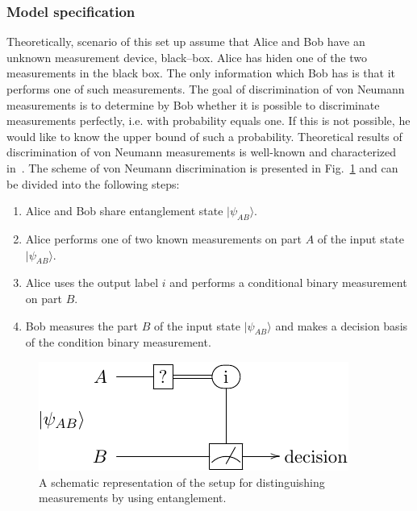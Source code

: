 \documentclass[preprint,12pt, a4paper]{elsarticle}
\newcommand{\ket}[1]{\ensuremath{|#1\rangle}}
\newcommand{\1}{{\rm 1\hspace{-0.9mm}l}}
\begin{document}
\subsubsection{Model specification}
Theoretically, scenario of this set up assume that Alice and Bob have an 
unknown measurement device, black--box.  Alice has hiden one of the two 
measurements  in the black box.  The only information which Bob has is that it 
performs one of such  measurements. 
The  goal of discrimination of von Neumann measurements  is to determine by Bob 
whether it is possible to discriminate measurements perfectly, i.e. with 
probability equals one. If this is not possible, he  would like to know the 
upper bound of such a probability.  Theoretical results of discrimination of 
von Neumann measurements is well-known and characterized 
in~\cite{puchala2018strategies}.    The scheme of von Neumann discrimination is 
presented in Fig.~\ref{fig:scheme} and 
can be divided into the following steps:

\begin{enumerate}
	\item Alice and Bob share entanglement state $\ket{\psi_{AB}}$.
	\item Alice performs one of two known measurements on part $A$ of the input 
	state  $\ket{\psi_{AB}}$.
	\item Alice  uses
	the output label $i$ and performs a conditional binary measurement on part 
	$B$.
	\item  Bob measures the part $B$ of the input state  $\ket{\psi_{AB}}$ and 
	makes a decision  basis of the condition binary measurement.
\end{enumerate}  


 

\begin{figure}[h]
	\centering 
	
	\includegraphics[width=0.9\linewidth]{gates1.pdf} 
	\caption{A schematic representation of the setup for distinguishing
		measurements by using entanglement. }
	\label{fig:scheme}
\end{figure}
\end{document}
